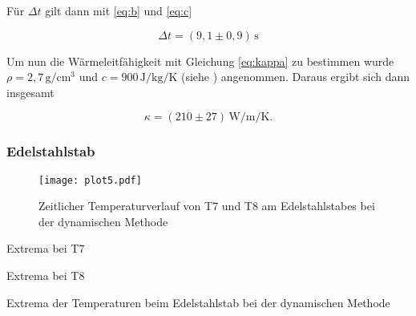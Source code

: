 \noindent Für $\Delta t$ gilt dann mit \ref{eq:b} und \ref{eq:c}

\begin{equation*}
  \Delta t=(9,1\pm0,9)\,\si{\second}
\end{equation*}

\noindent Um nun die Wärmeleitfähigkeit mit Gleichung \ref{eq:kappa} zu bestimmen wurde $\rho=2,7\,\si{\gram\per\centi\meter\tothe{3}}$ und $c=900\,\si{\joule\per\kilo\gram\per\kelvin}$ (siehe \cite{chemieAluminium}) angenommen.
Daraus ergibt sich dann insgesamt

\begin{equation*}
  \kappa=(210\pm27)\,\si{\watt\per\meter\per\kelvin}.
\end{equation*}



\subsubsection{Edelstahlstab}

\begin{figure}[H]
  \centering
  \texttt{[image: plot5.pdf]}
  \caption{Zeitlicher Temperaturverlauf von T7 und T8 am Edelstahlstabes bei der dynamischen Methode}
  \label{fig:g}
\end{figure}

 
  \begin{table}[H]
  \centering
    \begin{subtable}{.42\linewidth}
      \centering
            \caption{Extrema bei T7}

    \end{subtable}
    \begin{subtable}{.42\linewidth}
      \centering
           \caption{Extrema bei T8}

    \end{subtable} 
        \caption{Extrema der Temperaturen beim Edelstahlstab bei der dynamischen Methode}
    \label{tab:d}
\end{table}


